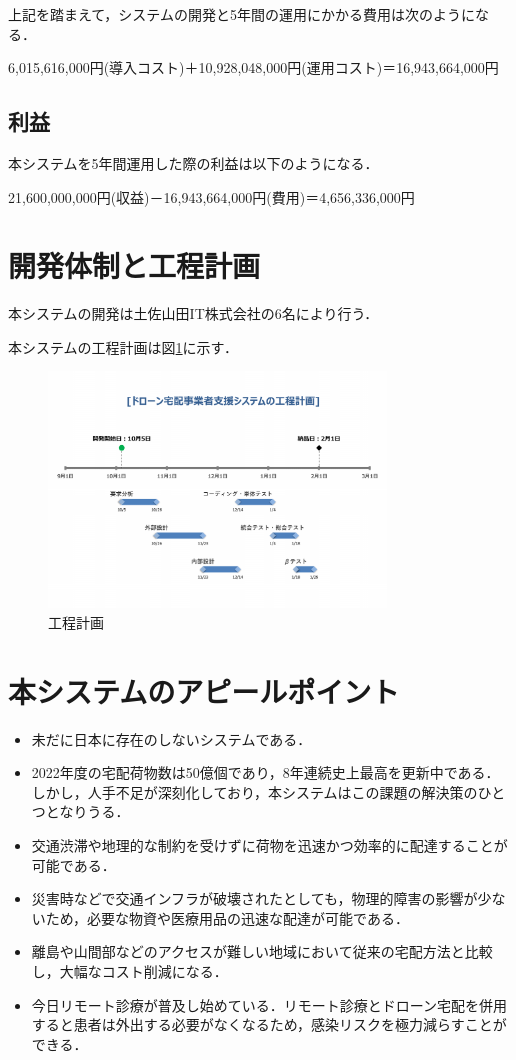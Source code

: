 \documentclass[a4paper, titlepage]{jsarticle}
\begin{document}
上記を踏まえて，システムの開発と5年間の運用にかかる費用は次のようになる．
\begin{center}
  6,015,616,000円(導入コスト)＋10,928,048,000円(運用コスト)＝16,943,664,000円
\end{center}

\subsection{利益}
本システムを5年間運用した際の利益は以下のようになる．
\begin{center}
  21,600,000,000円(収益)－16,943,664,000円(費用)＝4,656,336,000円
\end{center}

\section{開発体制と工程計画}
本システムの開発は土佐山田IT株式会社の6名により行う．

本システムの工程計画は図\ref{fig:schedule}に示す．
\begin{figure}[H]
  \centering
  \includegraphics[width=0.8\textwidth]{schedule.pdf}
  \caption{工程計画}
  \label{fig:schedule}
\end{figure}

\section{本システムのアピールポイント}
\begin{itemize}
  \item 未だに日本に存在のしないシステムである．
  \item 2022年度の宅配荷物数は50億個であり，8年連続史上最高を更新中である．しかし，人手不足が深刻化しており，本システムはこの課題の解決策のひとつとなりうる．
  \item 交通渋滞や地理的な制約を受けずに荷物を迅速かつ効率的に配達することが可能である．
  \item 災害時などで交通インフラが破壊されたとしても，物理的障害の影響が少ないため，必要な物資や医療用品の迅速な配達が可能である．
  \item 離島や山間部などのアクセスが難しい地域において従来の宅配方法と比較し，大幅なコスト削減になる．
  \item 今日リモート診療が普及し始めている．リモート診療とドローン宅配を併用すると患者は外出する必要がなくなるため，感染リスクを極力減らすことができる．
\end{itemize}
\end{document}
